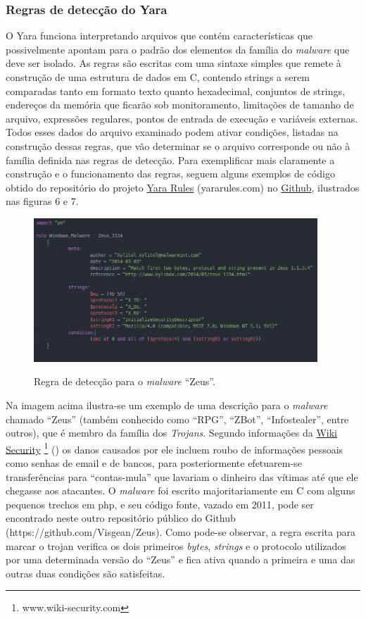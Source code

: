 \subsubsection{Regras de detecção do Yara}
\label{l.regrasdyara}
O Yara funciona interpretando arquivos que contém características que possivelmente
apontam para o padrão dos elementos da família do \textit{malware} que deve ser
isolado. As regras são escritas com uma sintaxe simples que remete à
construção de uma estrutura de dados em C, contendo strings a serem comparadas
tanto em formato texto quanto hexadecimal, conjuntos de strings, endereços da
memória que ficarão sob monitoramento, limitações de tamanho de arquivo,
expressões regulares, pontos de entrada de execução e variáveis externas.
Todos esses dados do arquivo examinado podem ativar condições, listadas na
construção dessas regras, que vão determinar se o arquivo corresponde ou não à
família definida nas regras de detecção. Para exemplificar mais claramente a
construção e o funcionamento das regras, seguem alguns exemplos de código
obtido do repositório do projeto \href{yararules.com}{Yara Rules} (yararules.com) no
\href{github.com}{Github}, ilustrados nas figuras 6 e 7.

\begin{figure}[H]
	\centering
	\caption{Regra de detecção para o \textit{malware} ``Zeus''.}
	\includegraphics[width=0.95\textwidth]{figs/zeus}
	\label{f.regrazeus}
\end{figure}

Na imagem acima ilustra-se um exemplo de uma descrição para o \textit{malware} chamado
``Zeus'' (também conhecido como ``RPG'', ``ZBot'', ``Infostealer'', entre
outros), que é membro da família dos \textit{Trojans}. Segundo informações da
\href{www.wiki-security.com}{Wiki Security} \footnote{www.wiki-security.com} (\citeyear{wikisecurity}) os danos
causados por ele incluem roubo de informações pessoais como senhas de email e de
bancos, para posteriormente efetuarem-se transferências para ``contas-mula'' que
lavariam o dinheiro das vítimas até que ele chegasse aos atacantes. O
\textit{malware} foi escrito majoritariamente em C com alguns pequenos trechos
em php, e seu código fonte, vazado em 2011, pode ser encontrado neste outro
repositório público do Github (https://github.com/Visgean/Zeus). Como
pode-se observar, a regra escrita para marcar o trojan verifica os dois
primeiros \textit{bytes}, \textit{strings} e o protocolo utilizados por uma
determinada versão do ``Zeus'' e fica ativa quando a primeira e uma das outras
duas condições são satisfeitas.

